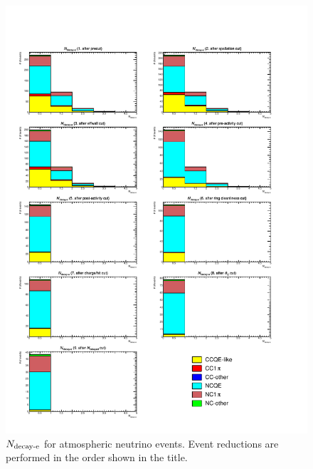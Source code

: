 \begin{figure}[h]
	\centering
	\includegraphics[width=15cm]{PDF/Dist_ATM/Che_50deg_tag_ge1/All/nmue}
	\caption[$N_{\rm decay\mathchar`-e}$ for atmospheric neutrino events]{
	$N_{\rm decay\mathchar`-e}$ for atmospheric neutrino events.
	Event reductions are performed in the order shown in the title.
	}\label{ATM_nmue}
\end{figure}

